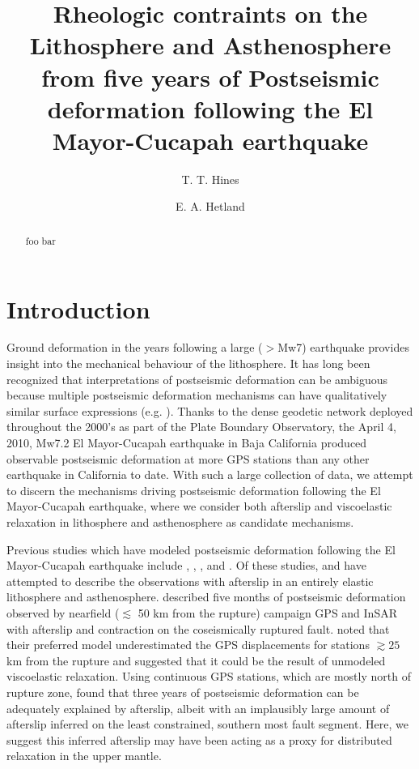 \documentclass[1p]{elsarticle}
\title{	
Rheologic contraints on the Lithosphere and Asthenosphere from five years of Postseismic deformation following the El Mayor-Cucapah earthquake}
\author{T. T. Hines\fnref{fn}}
\author{E. A. Hetland\fnref{fn}}
\begin{document}
\begin{abstract}
foo bar
\end{abstract}
\maketitle

\section{Introduction}
Ground deformation in the years following a large ($>$Mw7) earthquake provides insight into the mechanical behaviour of the lithosphere. It has long been recognized that interpretations of postseismic deformation can be ambiguous because multiple postseismic deformation mechanisms can have qualitatively similar surface expressions (e.g. \cite{Savage1990}). Thanks to the dense geodetic network deployed throughout the 2000's as part of the Plate Boundary Observatory, the April 4, 2010, Mw7.2 El Mayor-Cucapah earthquake in Baja California produced observable postseismic deformation at more GPS stations than any other earthquake in California to date. With such a large collection of data, we attempt to discern the mechanisms driving postseismic deformation following the El Mayor-Cucapah earthquake, where we consider both afterslip and viscoelastic relaxation in lithosphere and asthenosphere as candidate mechanisms. 

Previous studies which have modeled postseismic deformation following the El Mayor-Cucapah earthquake include \citet{Pollitz2012}, \citet{Gonzalez-ortega2014}, \citet{Spinler2015}, and \citet{Rollins2015}. Of these studies, \citet{Gonzalez-ortega2014} and \citet{Rollins2015} have attempted to describe the observations with afterslip in an entirely elastic lithosphere and asthenosphere.  \citet{Gonzalez-ortega2014} described five months of postseismic deformation observed by nearfield ($\lesssim$ 50 km from the rupture) campaign GPS and InSAR with afterslip and contraction on the coseismically ruptured fault. \citet{Gonzalez-ortega2014} noted that their preferred model underestimated the GPS displacements for stations $\gtrsim 25$ km from the rupture and suggested that it could be the result of unmodeled viscoelastic relaxation.  Using continuous GPS stations, which are mostly north of rupture zone, \citet{Rollins2015} found that three years of postseismic deformation can be adequately explained by afterslip, albeit with an implausibly large amount of afterslip inferred on the least constrained, southern most fault segment. Here, we suggest this inferred afterslip may have been acting as a proxy for distributed relaxation in the upper mantle. 
\end{document}
